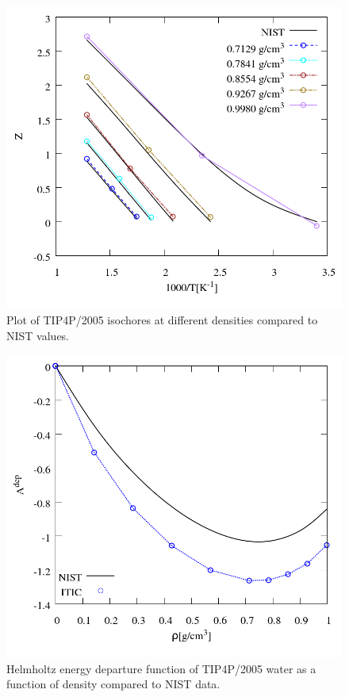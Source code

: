 \documentclass[%
 aip,
 jcp,
 sd,%
 amsmath,amssymb,
]{revtex4-1}
\begin{document}
\begin{figure}[!htbp]
\includegraphics[scale=0.35]{Figures/EXAMPLE-SIM_TIP4P05_zt.png}
\caption{Plot of TIP4P/2005 isochores at different densities compared to NIST values.}
\label{fig:EXAMPLE-SIM/TIP4P05/zt}
\end{figure}

\begin{figure}[!htbp]
\includegraphics[scale=0.35]{Figures/EXAMPLE-SIM_TIP4P05_adep.png}
\caption{Helmholtz energy departure function of TIP4P/2005 water as a function of density compared to NIST data.}
\label{fig:EXAMPLE-SIM/TIP4P05/adep}
\end{figure}
\end{document}
